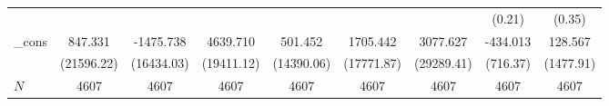 {\begin{tabular}{l*{8}{c}}
            &                                  &                                  &                                  &                                  &                                  &                                  &                   (0.21)         &                   (0.35)         \\
\_cons      &                  847.331         &                -1475.738         &                 4639.710         &                  501.452         &                 1705.442         &                 3077.627         &                 -434.013         &                  128.567         \\
            &               (21596.22)         &               (16434.03)         &               (19411.12)         &               (14390.06)         &               (17771.87)         &               (29289.41)         &                 (716.37)         &                (1477.91)         \\
\hline
\(N\)       &                     4607         &                     4607         &                     4607         &                     4607         &                     4607         &                     4607         &                     4607         &                     4607         \\
\hline\hline
\end{tabular}
}
